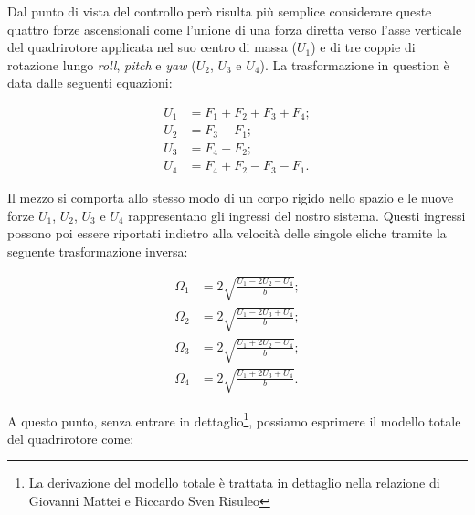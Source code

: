 \documentclass[a4paper,10pt]{article}
\begin{document}
Dal punto di vista del controllo però risulta più semplice considerare queste quattro forze ascensionali come l'unione di una forza diretta verso l'asse verticale del quadrirotore applicata nel suo centro di massa ($U_1$) e di tre coppie di rotazione lungo \emph{roll}, \emph{pitch} e \emph{yaw} ($U_2$, $U_3$ e $U_4$). La trasformazione in question è data dalle seguenti equazioni:

\begin{equation}
\begin{split}
U_1 &= F_1 + F_2 + F_3 + F_4; \\
U_2 &= F_3 - F_1; \\
U_3 &= F_4 - F_2; \\
U_4 &= F_4+F_2 - F_3 -F_1.
\end{split}
\end{equation}

Il mezzo si comporta allo stesso modo di un corpo rigido nello spazio e le nuove forze $U_1$, $U_2$, $U_3$ e $U_4$ rappresentano gli ingressi del nostro sistema. Questi ingressi possono poi essere riportati indietro alla velocità delle singole eliche tramite la seguente trasformazione inversa:

\begin{equation}
\begin{split}
\Omega_1 &= 2 \sqrt{\frac{U_1 - 2U_2 - U_4}{b}} ; \\
\Omega_2 &= 2 \sqrt{\frac{U_1 - 2U_3 + U_4}{b}} ; \\
\Omega_3 &= 2 \sqrt{\frac{U_1 + 2U_2 - U_4}{b}} ; \\
\Omega_4 &= 2 \sqrt{\frac{U_1 + 2U_3 + U_4}{b}}.
\end{split}
\end{equation}

A questo punto, senza entrare in dettaglio\footnote{La derivazione del modello totale è trattata in dettaglio nella relazione di Giovanni Mattei e Riccardo Sven Risuleo}, possiamo esprimere il modello totale del quadrirotore come:
\end{document}

